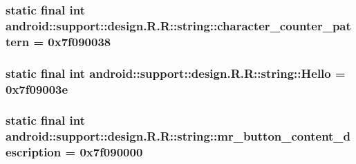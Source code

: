 \hypertarget{classandroid_1_1support_1_1design_1_1_r_1_1string_aecbf51003dd3d8f11ae4a71575098ca}{
\subsubsection[{character\_\-counter\_\-pattern}]{\setlength{\rightskip}{0pt plus 5cm}static final int android::support::design.R.R::string::character\_\-counter\_\-pattern = 0x7f090038}}
\label{classandroid_1_1support_1_1design_1_1_r_1_1string_aecbf51003dd3d8f11ae4a71575098ca}


\hypertarget{classandroid_1_1support_1_1design_1_1_r_1_1string_c4a76c4647885a3b39de6a4bf957820b}{
\subsubsection[{Hello}]{\setlength{\rightskip}{0pt plus 5cm}static final int android::support::design.R.R::string::Hello = 0x7f09003e}}
\label{classandroid_1_1support_1_1design_1_1_r_1_1string_c4a76c4647885a3b39de6a4bf957820b}


\hypertarget{classandroid_1_1support_1_1design_1_1_r_1_1string_ce68d7008549ba1af931fcf8b57371a4}{
\subsubsection[{mr\_\-button\_\-content\_\-description}]{\setlength{\rightskip}{0pt plus 5cm}static final int android::support::design.R.R::string::mr\_\-button\_\-content\_\-description = 0x7f090000}}
\label{classandroid_1_1support_1_1design_1_1_r_1_1string_ce68d7008549ba1af931fcf8b57371a4}



